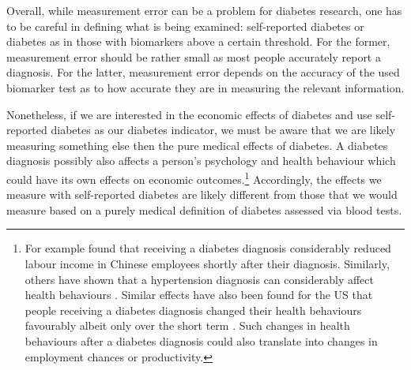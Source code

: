 Overall, while measurement error can be a problem for diabetes research,
one has to be careful in defining what is being examined: self-reported
diabetes or diabetes as in those with biomarkers above a certain threshold.
For the former, measurement error should be rather small as most people
accurately report a diagnosis. For the latter, measurement error depends
on the accuracy of the used biomarker test as to how accurate they
are in measuring the relevant information.

Nonetheless, if we are interested in the economic effects of diabetes
and use self-reported diabetes as our diabetes indicator, we must
be aware that we are likely measuring something else then the pure
medical effects of diabetes. A diabetes diagnosis possibly also affects
a person's psychology and health behaviour which could have its own
effects on economic outcomes.\footnote{For example \citet{Liu2014} found that receiving a diabetes diagnosis
considerably reduced labour income in Chinese employees shortly after
their diagnosis. Similarly, others have shown that a hypertension
diagnosis can considerably affect health behaviours \citep{Zhao2013a}.
Similar effects have also been found for the US that people receiving
a diabetes diagnosis changed their health behaviours favourably albeit
only over the short term \citep{Slade2012}. Such changes in health
behaviours after a diabetes diagnosis could also translate into changes
in employment chances or productivity.} Accordingly, the effects we measure with self-reported diabetes are
likely different from those that we would measure based on a purely
medical definition of diabetes assessed via blood tests.


  
  
  
  